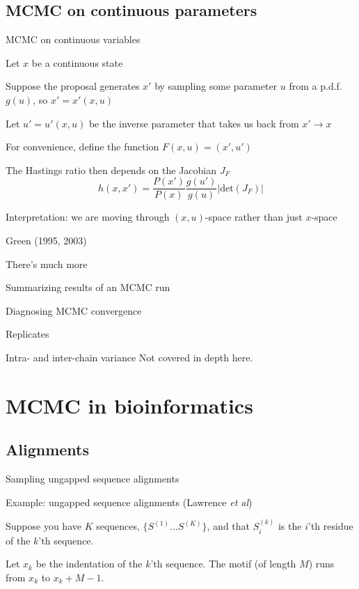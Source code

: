\documentclass{beamer}
\begin{document}
\subsection{MCMC on continuous parameters}

\begin{frame}{MCMC on continuous variables}

\itemb
\item Let $x$ be a continuous state
\item Suppose the proposal generates $x'$ by sampling some parameter $u$ from a p.d.f. $g(u)$, so $x'=x'(x,u)$
\itemb
 \item Let $u'=u'(x,u)$ be the \alert{inverse} parameter that takes us back from $x' \to x$
 \item For convenience, define the function $F(x,u) = (x',u')$
\iteme
\item The Hastings ratio then depends on the Jacobian $J_F$
\[
h(x,x') = \frac{P(x')}{P(x)} \frac{g(u')}{g(u)} \left| \mbox{det}\left(J_F\right) \right|
\]
\item Interpretation: we are moving through $(x,u)$-space rather than just $x$-space
\item Green (1995, 2003)
\iteme

\end{frame}



\begin{frame}{There's much more}

\itemb
\item Summarizing results of an MCMC run
\item Diagnosing MCMC convergence
\itemb
\item Replicates
\item Intra- and inter-chain variance
\iteme
\iteme
Not covered in depth here.

\end{frame}


\section{MCMC in bioinformatics}

\subsection{Alignments}

\begin{frame}{Sampling ungapped sequence alignments}

\itemb
\item Example: ungapped sequence alignments (Lawrence {\em et al})
 \itemb
 \item Suppose you have $K$ sequences, $\{ S^{(1)} \ldots S^{(K)} \}$, and that $S^{(k)}_i$ is the $i$'th residue of the $k$'th sequence.
 \item Let $x_k$ be the indentation of the $k$'th sequence. The motif (of length $M$) runs from $x_k$ to $x_k+M-1$.
 \iteme
\iteme

\end{frame}
\end{document}
